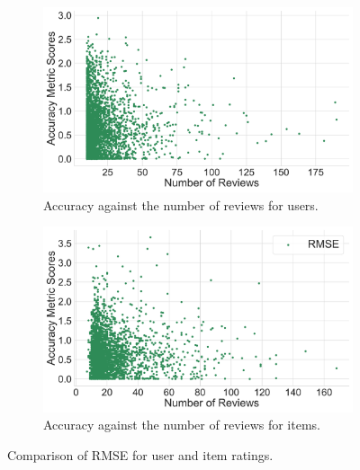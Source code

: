 \begin{figure}[htbp]
    \centering
    \begin{subfigure}{0.49\textwidth}
        \centering
        \includegraphics[width=\textwidth]{Figures/ncf_user_ratings_metrics.pdf}
        \caption{Accuracy against the number of reviews for users.}
        \label{fig:RMSE_USER_ACC}
    \end{subfigure}%
    \hfill
    \begin{subfigure}{0.49\textwidth}
        \centering
        \includegraphics[width=\textwidth]{Figures/ncf_item_ratings_metrics.pdf}
        \caption{Accuracy against the number of reviews for items.}
        \label{fig:RMSE_ITEM_ACC}
    \end{subfigure}
    \caption{Comparison of RMSE for user and item ratings.}
    \label{fig:RMSE_ACC}
\end{figure}


